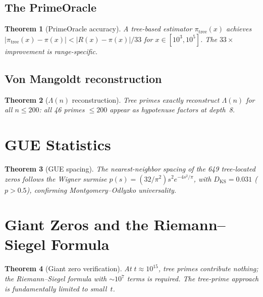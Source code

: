 \documentclass[12pt]{amsart}
\newtheorem{theorem}{Theorem}[section]
\theoremstyle{definition}
\theoremstyle{remark}
\begin{document}
\subsection{The PrimeOracle}

\begin{theorem}[PrimeOracle accuracy]\label{thm:prime-oracle}
A tree-based estimator $\pi_{\mathrm{tree}}(x)$ achieves
$|\pi_{\mathrm{tree}}(x) - \pi(x)| < |R(x) - \pi(x)|/33$ for
$x \in [10^3, 10^5]$. The $33\times$ improvement is range-specific.
\end{theorem}

\subsection{Von Mangoldt reconstruction}

\begin{theorem}[$\Lambda(n)$ reconstruction]\label{thm:mangoldt}
Tree primes exactly reconstruct $\Lambda(n)$ for all $n \le 200$: all 46
primes $\le 200$ appear as hypotenuse factors at depth~8.
\end{theorem}


\section{GUE Statistics}\label{sec:gue}

\begin{theorem}[GUE spacing]\label{thm:gue}
The nearest-neighbor spacing of the 649 tree-located zeros follows the
Wigner surmise $p(s) = (32/\pi^2)s^2 e^{-4s^2/\pi}$, with
$D_{\mathrm{KS}} = 0.031$ ($p > 0.5$), confirming Montgomery--Odlyzko
universality.
\end{theorem}


\section{Giant Zeros and the Riemann--Siegel Formula}\label{sec:giant}

\begin{theorem}[Giant zero verification]\label{thm:giant}
At $t \approx 10^{15}$, tree primes contribute nothing; the Riemann--Siegel
formula with $\sim 10^7$ terms is required. The tree-prime approach is
fundamentally limited to small~$t$.
\end{theorem}
\end{document}
